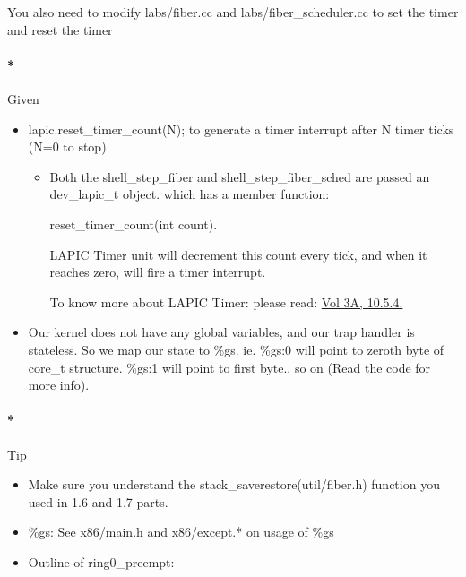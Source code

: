\documentclass[]{article}
\newenvironment{Shaded}{}{}
\newcommand{\DataTypeTok}[1]{\textcolor[rgb]{0.50,0.00,0.00}{{#1}}}
\newcommand{\NormalTok}[1]{{#1}}
\providecommand{\tightlist}{%
  \setlength{\itemsep}{0pt}\setlength{\parskip}{0pt}}
\let\oldparagraph\paragraph
\renewcommand{\paragraph}[1]{\oldparagraph{#1}\mbox{}}
\begin{document}
You also need to modify labs/fiber.cc and labs/fiber\_scheduler.cc to
set the timer and reset the timer

\paragraph*{Given}\label{given-7}

\begin{itemize}
\tightlist
\item
  lapic.reset\_timer\_count(N); to generate a timer interrupt after N
  timer ticks (N=0 to stop)

  \begin{itemize}
  \item
    Both the shell\_step\_fiber and shell\_step\_fiber\_sched are passed
    an dev\_lapic\_t object. which has a member function:

\begin{Shaded}
\begin{Highlighting}[]
\NormalTok{reset_timer_count(}\DataTypeTok{int} \NormalTok{count).}
\end{Highlighting}
\end{Shaded}

    LAPIC Timer unit will decrement this count every tick, and when it
    reaches zero, will fire a timer interrupt.

    To know more about LAPIC Timer: please read:
    \href{http://www.cse.iitd.ac.in/~deepak/hohlabs/intel.pdf}{Vol 3A,
    10.5.4.}
  \end{itemize}
\item
  Our kernel does not have any global variables, and our trap handler is
  stateless. So we map our state to \%gs. ie. \%gs:0 will point to
  zeroth byte of core\_t structure. \%gs:1 will point to first byte.. so
  on (Read the code for more info).
\end{itemize}

\paragraph*{Tip}\label{tip-7}

\begin{itemize}
\item
  Make sure you understand the stack\_saverestore(util/fiber.h) function
  you used in 1.6 and 1.7 parts.
\item
  \%gs: See x86/main.h and x86/except.* on usage of \%gs
\item
  Outline of ring0\_preempt:
\end{itemize}
\end{document}

